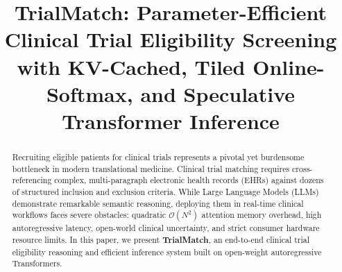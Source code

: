 \documentclass[conference]{IEEEtran}
\begin{document}
\title{TrialMatch: Parameter-Efficient Clinical Trial Eligibility Screening with KV-Cached, Tiled Online-Softmax, and Speculative Transformer Inference}

\author{
}

\maketitle

\begin{abstract}
Recruiting eligible patients for clinical trials represents a pivotal yet burdensome bottleneck in modern translational medicine. Clinical trial matching requires cross-referencing complex, multi-paragraph electronic health records (EHRs) against dozens of structured inclusion and exclusion criteria. While Large Language Models (LLMs) demonstrate remarkable semantic reasoning, deploying them in real-time clinical workflows faces severe obstacles: quadratic $\mathcal{O}(N^2)$ attention memory overhead, high autoregressive latency, open-world clinical uncertainty, and strict consumer hardware resource limits. In this paper, we present \textbf{TrialMatch}, an end-to-end clinical trial eligibility reasoning and efficient inference system built on open-weight autoregressive Transformers. 


\end{abstract}
\end{document}
